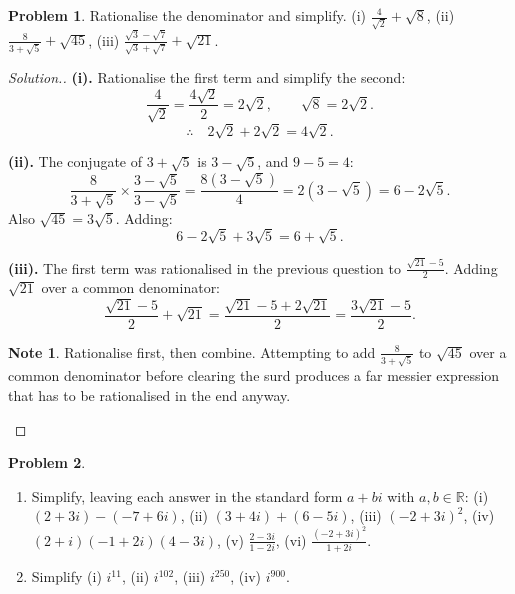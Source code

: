 \documentclass[11pt,a4paper]{article}
\theoremstyle{definition}
\newtheorem{note}[thm]{Note}
\newtheorem{problemx}{Problem}[section]
\newenvironment{problem}{\begin{problemx}}{\end{problemx}}
\newenvironment{solution}
  {\renewcommand{\qedsymbol}{}\begin{proof}[\textit{Solution}.]}
  {\end{proof}}
\begin{document}
\begin{problem}
Rationalise the denominator and simplify.
\quad (i) $\frac{4}{\sqrt{2}}+\sqrt{8}$, \quad
(ii) $\frac{8}{3+\sqrt{5}}+\sqrt{45}$, \quad
(iii) $\frac{\sqrt{3}-\sqrt{7}}{\sqrt{3}+\sqrt{7}}+\sqrt{21}$.
\end{problem}

\begin{solution}
\textbf{(i).} Rationalise the first term and simplify the second:
$$\frac{4}{\sqrt{2}}=\frac{4\sqrt{2}}{2}=2\sqrt{2},\qquad \sqrt{8}=2\sqrt{2}.$$
$$\therefore\quad 2\sqrt{2}+2\sqrt{2}=4\sqrt{2}.$$

\textbf{(ii).} The conjugate of $3+\sqrt{5}$ is $3-\sqrt{5}$, and $9-5=4$:
$$\frac{8}{3+\sqrt{5}}\times\frac{3-\sqrt{5}}{3-\sqrt{5}}
=\frac{8\left(3-\sqrt{5}\right)}{4}=2\left(3-\sqrt{5}\right)=6-2\sqrt{5}.$$
Also $\sqrt{45}=3\sqrt{5}$. Adding:
$$6-2\sqrt{5}+3\sqrt{5}=6+\sqrt{5}.$$

\textbf{(iii).} The first term was rationalised in the previous question to
$\frac{\sqrt{21}-5}{2}$. Adding $\sqrt{21}$ over a common denominator:
$$\frac{\sqrt{21}-5}{2}+\sqrt{21}=\frac{\sqrt{21}-5+2\sqrt{21}}{2}
=\frac{3\sqrt{21}-5}{2}.$$

\begin{note}
Rationalise first, then combine. Attempting to add $\frac{8}{3+\sqrt{5}}$ to $\sqrt{45}$
over a common denominator before clearing the surd produces a far messier expression
that has to be rationalised in the end anyway.
\end{note}
\end{solution}

\begin{problem}
\begin{enumerate}
\item[(a).] Simplify, leaving each answer in the standard form $a+bi$ with
$a,b\in\mathbb{R}$:
\quad (i) $(2+3i)-(-7+6i)$, \quad (ii) $(3+4i)+(6-5i)$, \quad (iii) $(-2+3i)^2$, \quad
(iv) $(2+i)(-1+2i)(4-3i)$, \quad (v) $\frac{2-3i}{1-2i}$, \quad
(vi) $\frac{(-2+3i)^2}{1+2i}$.
\item[(b).] Simplify \quad (i) $i^{11}$, \quad (ii) $i^{102}$, \quad (iii) $i^{250}$,
\quad (iv) $i^{900}$.
\end{enumerate}
\end{problem}
\end{document}
